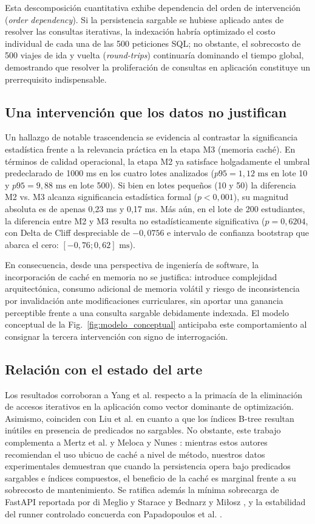 \documentclass[conference]{IEEEtran}
\begin{document}
Esta descomposición cuantitativa exhibe dependencia del orden de intervención (\textit{order dependency}). Si la persistencia sargable se hubiese aplicado antes de resolver las consultas iterativas, la indexación habría optimizado el costo individual de cada una de las 500 peticiones SQL; no obstante, el sobrecosto de 500 viajes de ida y vuelta (\textit{round-trips}) continuaría dominando el tiempo global, demostrando que resolver la proliferación de consultas en aplicación constituye un prerrequisito indispensable.

\subsection{Una intervención que los datos no justifican}
Un hallazgo de notable trascendencia se evidencia al contrastar la significancia estadística frente a la relevancia práctica en la etapa M3 (memoria caché). En términos de calidad operacional, la etapa M2 ya satisface holgadamente el umbral predeclarado de 1000 ms en los cuatro lotes analizados ($p95 = 1,12\text{ ms}$ en lote 10 y $p95 = 9,88\text{ ms}$ en lote 500). Si bien en lotes pequeños (10 y 50) la diferencia M2 vs. M3 alcanza significancia estadística formal ($p < 0,001$), su magnitud absoluta es de apenas 0,23 ms y 0,17 ms. Más aún, en el lote de 200 estudiantes, la diferencia entre M2 y M3 resulta no estadísticamente significativa ($p = 0,6204$, con Delta de Cliff despreciable de $-0,0756$ e intervalo de confianza bootstrap que abarca el cero: $[-0,76; 0,62]\text{ ms}$).

En consecuencia, desde una perspectiva de ingeniería de software, la incorporación de caché en memoria no se justifica: introduce complejidad arquitectónica, consumo adicional de memoria volátil y riesgo de inconsistencia por invalidación ante modificaciones curriculares, sin aportar una ganancia perceptible frente a una consulta sargable debidamente indexada. El modelo conceptual de la Fig.~\ref{fig:modelo_conceptual} anticipaba este comportamiento al consignar la tercera intervención con signo de interrogación.

\subsection{Relación con el estado del arte}
Los resultados corroboran a Yang et al. \cite{Yang2019} respecto a la primacía de la eliminación de accesos iterativos en la aplicación como vector dominante de optimización. Asimismo, coinciden con Liu et al. \cite{Liu2023} en cuanto a que los índices B-tree resultan inútiles en presencia de predicados no sargables. No obstante, este trabajo complementa a Mertz et al. \cite{Mertz2021} y Meloca y Nunes \cite{Meloca2022}: mientras estos autores recomiendan el uso ubicuo de caché a nivel de método, nuestros datos experimentales demuestran que cuando la persistencia opera bajo predicados sargables e índices compuestos, el beneficio de la caché es marginal frente a su sobrecosto de mantenimiento. Se ratifica además la mínima sobrecarga de FastAPI reportada por di Meglio y Starace \cite{diMeglio2024} y Bednarz y Miłosz \cite{Bednarz2025}, y la estabilidad del runner controlado concuerda con Papadopoulos et al. \cite{Papadopoulos2021}.
\end{document}
